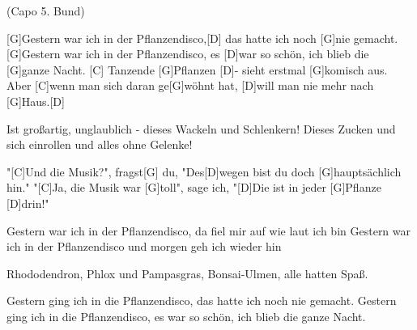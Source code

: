
{\footnotesize(Capo 5. Bund)}

\begin{guitar}
	[G]Gestern war ich in der Pflanzendisco,[D] das hatte ich noch [G]nie gemacht.
	[G]Gestern war ich in der Pflanzendisco, es [D]war so schön, ich blieb die [G]ganze Nacht.
	[C] Tanzende [G]Pflanzen [D]- sieht erstmal [G]komisch aus.
	Aber [C]wenn man sich daran ge[G]wöhnt hat, [D]will man nie mehr nach [G]Haus.[D]{}
	
	Ist großartig, unglaublich - dieses Wackeln und Schlenkern!
	Dieses Zucken und sich einrollen und alles ohne Gelenke!
	
	"[C]Und die Musik?", fragst[G] du, "Des[D]wegen bist du doch [G]hauptsächlich hin."
	"[C]Ja, die Musik war [G]toll", sage ich, "[D]Die ist in jeder [G]Pflanze [D]drin!"
	
	 
	
	Gestern war ich in der Pflanzendisco, da fiel mir auf wie laut ich bin
	Gestern war ich in der Pflanzendisco und morgen geh ich wieder hin
	
	Rhododendron, Phlox und Pampasgras,
	Bonsai-Ulmen, alle hatten Spaß.
	
	Gestern ging ich in die Pflanzendisco, das hatte ich noch nie gemacht.
	Gestern ging ich in die Pflanzendisco, es war so schön, ich blieb die ganze Nacht.
	
	 
\end{guitar}